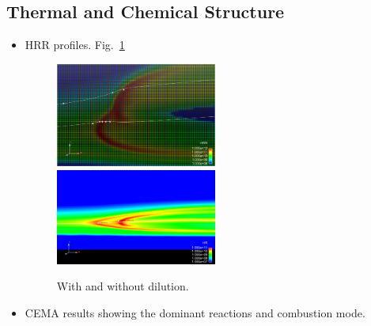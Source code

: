 \documentclass[11pt,english]{article}
\begin{document}
\subsection{Thermal and Chemical Structure}
\begin{itemize}
  \item HRR profiles.  Fig.~\ref{fig:HRR_dilution}
    \begin{figure}[t]
      \centering
      \scriptsize
      \includegraphics[width=0.5\textwidth]{HRR_nodil.png}
      \includegraphics[width=0.5\textwidth]{HRR_dilution.png}
      \normalsize
      \caption{With and without dilution.}
      \label{fig:HRR_dilution}
    \end{figure} 
  \item CEMA results showing the dominant reactions and combustion mode.
\end{itemize}
\end{document}
